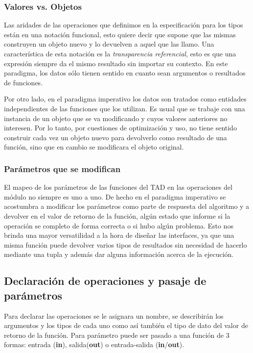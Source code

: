 \subsubsection*{Valores vs. Objetos}

Las aridades de las operaciones que definimos en la especificaci\'on para los tipos est\'an en una notaci\'on funcional, esto quiere decir que supone que las mismas construyen un objeto nuevo y lo devuelven a aquel que las llamo. Una caracter\'istica de esta notaci\'on es la \textit{transparencia referencial}, esto es que una expresi\'on siempre da el mismo resultado sin importar su contexto. En este paradigma, los datos s\'olo tienen sentido en cuanto sean argumentos o resultados de funciones.

Por otro lado, en el paradigma imperativo los datos son tratados como entidades independientes de las funciones que los utilizan. Es usual que se trabaje con una instancia de un objeto que se va modificando y cuyos valores anteriores no interesen. Por lo tanto, por cuestiones de optimizaci\'on y uso, no tiene sentido construir cada vez un objeto nuevo para devolverlo como resultado de una funci\'on, sino que en cambio se modificara el objeto original.

\subsubsection*{Par\'ametros que se modifican}

El mapeo de los par\'ametros de las funciones del TAD en las operaciones del m\'odulo no siempre es uno a uno. De hecho en el paradigma imperativo se acostumbra a modificar los par\'ametros como parte de respuesta del algoritmo y a devolver en el valor de retorno de la funci\'on, alg\'un estado que informe si la operaci\'on se completo de forma correcta o si hubo alg\'un problema. Esto nos brinda una mayor versatilidad a la hora de dise\~nar las interfaces, ya que una misma funci\'on puede devolver varios tipos de resultados sin necesidad de hacerlo mediante una tupla y adem\'as dar alguna informaci\'on acerca de la ejecuci\'on.

\subsection{Declaraci\'on de operaciones y pasaje de par\'ametros}

Para declarar las operaciones se le asignara un nombre, se describir\'an los argumentos y los tipos de cada uno como as\'i tambi\'en el tipo de dato del valor de retorno de la funci\'on. Para par\'ametro puede ser pasado a una funci\'on de 3 formas: entrada (\textbf{in}), salida(\textbf{out}) o entrada-salida (\textbf{in}/\textbf{out}).

